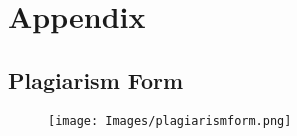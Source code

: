 \chapter*{Appendix}

\section*{Plagiarism Form}
\begin{figure}[H]
	\centering
	\texttt{[image: Images/plagiarismform.png]}
\end{figure}